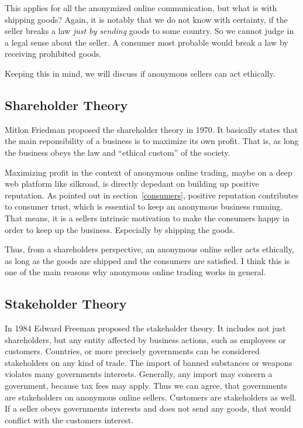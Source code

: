 This applies for all the anonymized online communication, but what is with shipping goods? Again, it is notably that we do not know with certainty, if the seller breaks a law \emph{just by sending} goods to some country. So we cannot judge in a legal sense about the seller. A consumer most probable would break a law by receiving prohibited goods.

Keeping this in mind, we will discuss if anonymous sellers can act ethically.

\subsection{Shareholder Theory}

Mitlon Friedman proposed the shareholder theory in 1970. It basically states that the main reponsibility of a business is to maximize its own profit. That is, as long the business obeys the law and ``ethical custom'' of the society\cite{shareholder}. 

Maximizing profit in the context of anonymous online trading, maybe on a deep web platform like silkroad, is directly depedant on building up positive reputation. As pointed out in section~\ref{consumers}, positive reputation contributes to consumer trust, which is essential to keep an anonymous business running. That means, it is a sellers intrinsic motivation to make the consumers happy in order to keep up the business. Especially by shipping the goods.

Thus, from a shareholders perspective, an anonymous online seller acts ethically, as long as the goods are shipped and the consumers are satisfied. I think this is one of the main reasons why anonymous online trading works in general.

\subsection{Stakeholder Theory}

In 1984 Edward Freeman proposed the stakeholder theory\cite{stakeholder}. It includes not just shareholders, but any entity affected by business actions, such as employees or customers. Countries, or more precisely governments can be considered stakeholders on any kind of trade. The import of banned substances or weapons violates many governments interests. Generally, any import may concern a government, because tax fees may apply. Thus we can agree, that governments are stakeholders on anonymous online sellers. Customers are stakeholders as well. If a seller obeys governments interests and does not send any goods, that would conflict with the customers interest.

